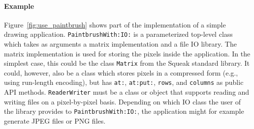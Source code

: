 \paragraph{Example}
Figure~\ref{fig:use_paintbrush} shows part of the implementation of a simple drawing application. \texttt{PaintbrushWith:IO:} is a parameterized top-level class which takes as arguments a matrix implementation and a file IO library. The matrix implementation is used for storing the pixels inside the application. In the simplest case, this could be the class \texttt{Matrix} from the Squeak standard library. It could, however, also be a class which stores pixels in a compressed form (e.g., using run-length encoding), but has \texttt{at:}, \texttt{at:put:}, \texttt{rows}, and \texttt{columns} as public API methods. \texttt{ReaderWriter} must be a class or object that supports reading and writing files on a pixel-by-pixel basis. Depending on which IO class the user of the library provides to \texttt{PaintbrushWith:IO:}, the application might for example generate JPEG files or PNG files.

